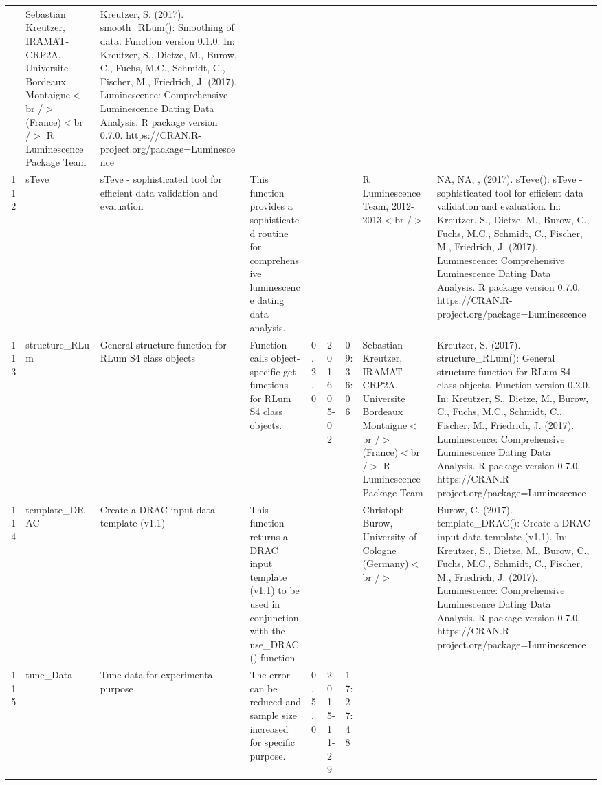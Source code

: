 \begin{table}[ht]
\begin{tabular}{rllllllll}
 & Sebastian Kreutzer, IRAMAT-CRP2A, Universite Bordeaux Montaigne$<$br /$>$ (France)$<$br /$>$  R Luminescence Package Team & Kreutzer, S. (2017). smooth\_RLum(): Smoothing of data. Function version 0.1.0. In: Kreutzer, S., Dietze, M., Burow, C., Fuchs, M.C., Schmidt, C., Fischer, M., Friedrich, J. (2017). Luminescence: Comprehensive Luminescence Dating Data Analysis. R package version 0.7.0. https://CRAN.R-project.org/package=Luminescence
 \\ 
  112 & sTeve & sTeve - sophisticated tool for efficient data validation and evaluation & This function provides a sophisticated routine for comprehensive luminescence dating data analysis. &  &  &  & R Luminescence Team, 2012-2013$<$br /$>$ & NA, NA, ,  (2017). sTeve(): sTeve - sophisticated tool for efficient data validation and evaluation. In: Kreutzer, S., Dietze, M., Burow, C., Fuchs, M.C., Schmidt, C., Fischer, M., Friedrich, J. (2017). Luminescence: Comprehensive Luminescence Dating Data Analysis. R package version 0.7.0. https://CRAN.R-project.org/package=Luminescence
 \\ 
  113 & structure\_RLum & General structure function for RLum S4 class objects & Function calls object-specific get functions for RLum S4 class objects. & 0.2.0 & 2016-05-02 & 09:36:06
 & Sebastian Kreutzer, IRAMAT-CRP2A, Universite Bordeaux Montaigne$<$br /$>$ (France)$<$br /$>$  R Luminescence Package Team & Kreutzer, S. (2017). structure\_RLum(): General structure function for RLum S4 class objects. Function version 0.2.0. In: Kreutzer, S., Dietze, M., Burow, C., Fuchs, M.C., Schmidt, C., Fischer, M., Friedrich, J. (2017). Luminescence: Comprehensive Luminescence Dating Data Analysis. R package version 0.7.0. https://CRAN.R-project.org/package=Luminescence
 \\ 
  114 & template\_DRAC & Create a DRAC input data template (v1.1) & This function returns a DRAC input template (v1.1) to be used in conjunction with the use\_DRAC() function &  &  &  & Christoph Burow, University of Cologne (Germany)$<$br /$>$ & Burow, C. (2017). template\_DRAC(): Create a DRAC input data template (v1.1). In: Kreutzer, S., Dietze, M., Burow, C., Fuchs, M.C., Schmidt, C., Fischer, M., Friedrich, J. (2017). Luminescence: Comprehensive Luminescence Dating Data Analysis. R package version 0.7.0. https://CRAN.R-project.org/package=Luminescence
 \\ 
  115 & tune\_Data & Tune data for experimental purpose & The error can be reduced and sample size increased for specific purpose. & 0.5.0 & 2015-11-29 & 17:27:48

\end{tabular}
\end{table}
